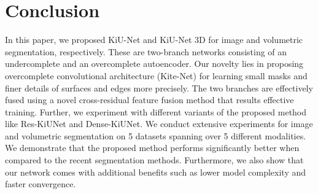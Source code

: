 \documentclass[journal,twoside,web]{ieeecolor}
\begin{document}
\section{Conclusion}

In this paper, we proposed KiU-Net and KiU-Net 3D for image and volumetric segmentation, respectively. These are two-branch networks consisting  of an undercomplete and   an overcomplete autoencoder.  Our novelty lies in proposing overcomplete convolutional architecture (Kite-Net) for learning small masks and finer details of surfaces and edges more precisely. The two branches are effectively fused using a novel  cross-residual feature fusion method that results effective training.  Further, we experiment with different variants of the proposed method like Res-KiUNet and Dense-KiUNet. We conduct extensive experiments for image and volumetric segmentation on 5 datasets spanning over 5 different modalities. We demonstrate that the proposed  method performs significantly better when compared to the recent segmentation methods. Furthermore, we also show that our network comes with additional benefits such as lower model complexity and  faster convergence.   




\end{document}
